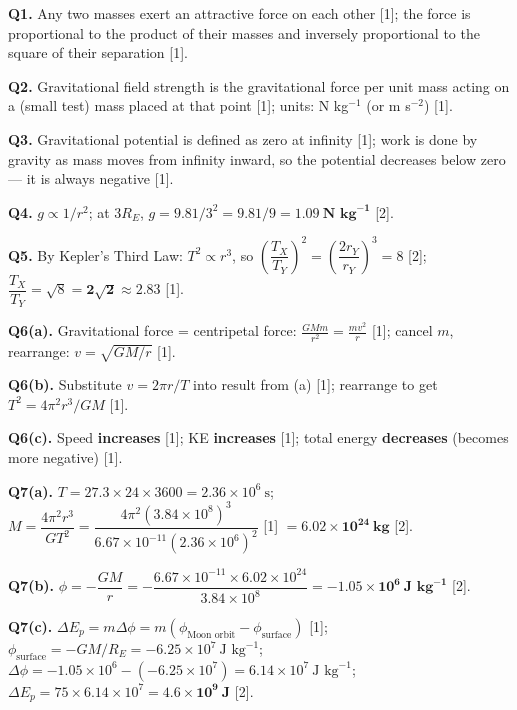 \begin{markscheme}

\textbf{Q1.} Any two masses exert an attractive force on each other [1]; the force is proportional to the product of their masses and inversely proportional to the square of their separation [1].

\vspace{0.5em}\textbf{Q2.} Gravitational field strength is the gravitational force per unit mass acting on a (small test) mass placed at that point [1]; units: N kg$^{-1}$ (or m s$^{-2}$) [1].

\vspace{0.5em}\textbf{Q3.} Gravitational potential is defined as zero at infinity [1]; work is done by gravity as mass moves from infinity inward, so the potential decreases below zero — it is always negative [1].

\vspace{0.5em}\textbf{Q4.} $g \propto 1/r^2$; at $3R_E$, $g = 9.81/3^2 = 9.81/9 = \mathbf{1.09\ \text{N kg}^{-1}}$ [2].

\vspace{0.5em}\textbf{Q5.} By Kepler's Third Law: $T^2 \propto r^3$, so $\left(\dfrac{T_X}{T_Y}\right)^2 = \left(\dfrac{2r_Y}{r_Y}\right)^3 = 8$ [2]; $\dfrac{T_X}{T_Y} = \sqrt{8} = \mathbf{2\sqrt{2} \approx 2.83}$ [1].

\vspace{0.5em}\textbf{Q6(a).} Gravitational force = centripetal force: $\frac{GMm}{r^2} = \frac{mv^2}{r}$ [1]; cancel $m$, rearrange: $v = \sqrt{GM/r}$ [1].

\vspace{0.5em}\textbf{Q6(b).} Substitute $v = 2\pi r/T$ into result from (a) [1]; rearrange to get $T^2 = 4\pi^2 r^3/GM$ [1].

\vspace{0.5em}\textbf{Q6(c).} Speed \textbf{increases} [1]; KE \textbf{increases} [1]; total energy \textbf{decreases} (becomes more negative) [1].

\vspace{0.5em}\textbf{Q7(a).} $T = 27.3 \times 24 \times 3600 = 2.36\times10^6\ \text{s}$; $M = \dfrac{4\pi^2 r^3}{GT^2} = \dfrac{4\pi^2 (3.84\times10^8)^3}{6.67\times10^{-11}(2.36\times10^6)^2}$ [1] $= \mathbf{6.02\times10^{24}\ \text{kg}}$ [2].

\vspace{0.5em}\textbf{Q7(b).} $\phi = -\dfrac{GM}{r} = -\dfrac{6.67\times10^{-11}\times 6.02\times10^{24}}{3.84\times10^8} = \mathbf{-1.05\times10^6\ \text{J kg}^{-1}}$ [2].

\vspace{0.5em}\textbf{Q7(c).} $\Delta E_p = m\Delta\phi = m(\phi_{\text{Moon orbit}} - \phi_{\text{surface}})$ [1]; $\phi_\text{surface} = -GM/R_E = -6.25\times10^7\ \text{J kg}^{-1}$; $\Delta\phi = -1.05\times10^6 - (-6.25\times10^7) = 6.14\times10^7\ \text{J kg}^{-1}$; $\Delta E_p = 75\times 6.14\times10^7 = \mathbf{4.6\times10^9\ \text{J}}$ [2].

\end{markscheme}

